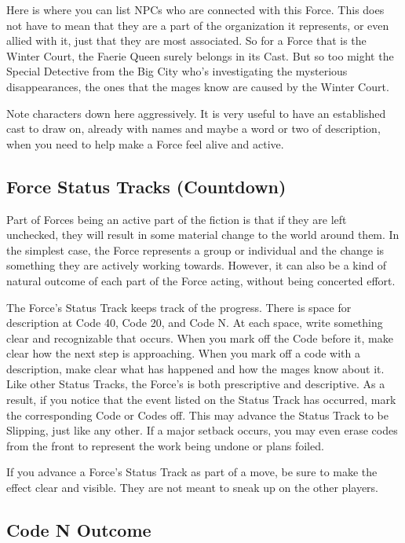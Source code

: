 \documentclass[
]{memoir}
\begin{document}
Here is where you can list NPCs who are connected with this Force. This
does not have to mean that they are a part of the organization it
represents, or even allied with it, just that they are most associated.
So for a Force that is the Winter Court, the Faerie Queen surely belongs
in its Cast. But so too might the Special Detective from the Big City
who's investigating the mysterious disappearances, the ones that the
mages know are caused by the Winter Court.

Note characters down here aggressively. It is very useful to have an
established cast to draw on, already with names and maybe a word or two
of description, when you need to help make a Force feel alive and
active.

\hypertarget{force-status-tracks-countdown}{%
\subsection{Force Status Tracks
(Countdown)}\label{force-status-tracks-countdown}}

Part of Forces being an active part of the fiction is that if they are
left unchecked, they will result in some material change to the world
around them. In the simplest case, the Force represents a group or
individual and the change is something they are actively working
towards. However, it can also be a kind of natural outcome of each part
of the Force acting, without being concerted effort.

The Force's Status Track keeps track of the progress. There is space for
description at Code 40, Code 20, and Code N. At each space, write
something clear and recognizable that occurs. When you mark off the Code
before it, make clear how the next step is approaching. When you mark
off a code with a description, make clear what has happened and how the
mages know about it. Like other Status Tracks, the Force's is both
prescriptive and descriptive. As a result, if you notice that the event
listed on the Status Track has occurred, mark the corresponding Code or
Codes off. This may advance the Status Track to be Slipping, just like
any other. If a major setback occurs, you may even erase codes from the
front to represent the work being undone or plans foiled.

If you advance a Force's Status Track as part of a move, be sure to make
the effect clear and visible. They are not meant to sneak up on the
other players.

\hypertarget{code-n-outcome}{%
\subsection{Code N Outcome}\label{code-n-outcome}}
\end{document}
